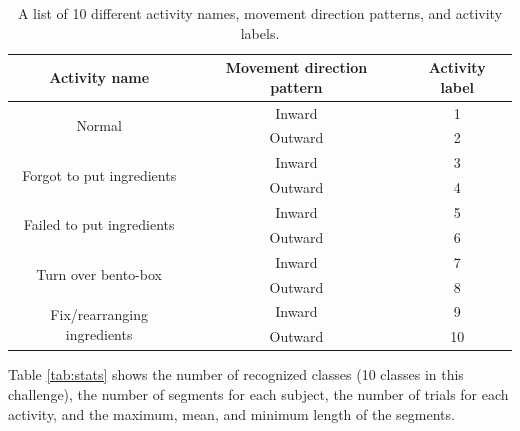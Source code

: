 \documentclass[graybox]{svmult}
\begin{document}
\begin{table}[h]
    \centering
    \caption{A list of 10 different activity names, movement direction patterns, and activity labels.}
    \begin{tabular}{c|c|c}\hline\hline
    Activity name & Movement direction pattern & Activity label \\ \hline
    \multirow{2}{*}{Normal} & Inward & 1 \\ \cline{2-3}
    & Outward & 2 \\ \hline
    \multirow{2}{*}{Forgot to put ingredients} & Inward & 3 \\ \cline{2-3}
    & Outward & 4 \\ \hline
    \multirow{2}{*}{Failed to put ingredients} & Inward & 5 \\ \cline{2-3}
    & Outward & 6 \\ \hline
    \multirow{2}{*}{Turn over bento-box} & Inward & 7 \\ \cline{2-3}
    & Outward & 8 \\ \hline
    \multirow{2}{*}{Fix/rearranging ingredients} & Inward & 9 \\ \cline{2-3}
    & Outward & 10 \\ \hline
    \end{tabular}
    \label{tab:activity}
\end{table}

Table \ref{tab:stats} shows the number of recognized classes (10 classes in this challenge), the number of segments for each subject, the number of trials for each activity, and the maximum, mean, and minimum length of the segments.\par
\end{document}
